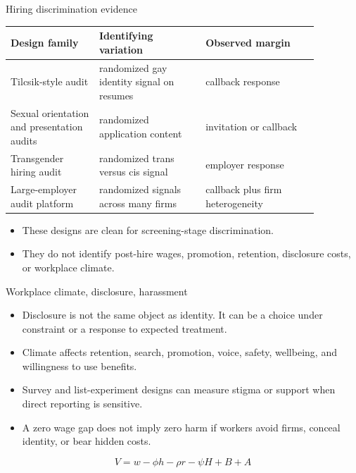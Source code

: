 \documentclass[aspectratio=169,11pt]{beamer}
\begin{document}
\begin{frame}{Hiring discrimination evidence}
\scriptsize
\begin{tabular}{p{0.25\linewidth} p{0.30\linewidth} p{0.32\linewidth}}
\toprule
Design family & Identifying variation & Observed margin \\
\midrule
Tilcsik-style audit & randomized gay identity signal on resumes & callback response \\
Sexual orientation and presentation audits & randomized application content & invitation or callback \\
Transgender hiring audit & randomized trans versus cis signal & employer response \\
Large-employer audit platform & randomized signals across many firms & callback plus firm heterogeneity \\
\bottomrule
\end{tabular}
\vspace{0.25cm}
\begin{itemize}
    \item These designs are clean for screening-stage discrimination.
    \item They do not identify post-hire wages, promotion, retention, disclosure costs, or workplace climate.
\end{itemize}
\end{frame}

\begin{frame}{Workplace climate, disclosure, harassment}
\begin{itemize}
    \item Disclosure is not the same object as identity. It can be a choice under constraint or a response to expected treatment.
    \item Climate affects retention, search, promotion, voice, safety, wellbeing, and willingness to use benefits.
    \item Survey and list-experiment designs can measure stigma or support when direct reporting is sensitive.
    \item A zero wage gap does not imply zero harm if workers avoid firms, conceal identity, or bear hidden costs.
\end{itemize}
\vspace{0.15cm}
\[
V = w - \phi h - \rho r - \psi H + B + A
\]
\end{frame}
\end{document}

